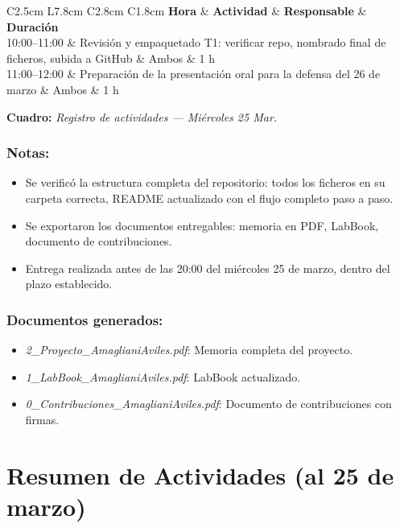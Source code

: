 \documentclass[11pt,a4paper]{article}
\newcommand{\notetitle}[1]{\subsubsection*{#1}}
\newcommand{\activitytable}[2]{%
  \begin{center}
  \begin{tabular}{C{2.5cm} L{7.8cm} C{2.8cm} C{1.8cm}}
  \toprule
  \rowcolor{white}
  \textbf{Hora} & \textbf{Actividad} & \textbf{Responsable} & \textbf{Duración} \\
  \midrule
  #1
  \bottomrule
  \end{tabular}
  \end{center}
  \vspace{-4pt}
  {\small\textbf{Cuadro:} \textit{#2}}
  \vspace{6pt}
}
\begin{document}
\activitytable{%
  10:00--11:00 & Revisión y empaquetado T1: verificar repo, nombrado final de ficheros, subida a GitHub & Ambos & 1 h \\
  \rowcolor{tablegray}
  11:00--12:00 & Preparación de la presentación oral para la defensa del 26 de marzo & Ambos & 1 h \\
}{Registro de actividades --- Miércoles 25 Mar.}

\notetitle{Notas:}
\begin{itemize}
  \item Se verificó la estructura completa del repositorio: todos los ficheros en su carpeta correcta, README actualizado con el flujo completo paso a paso.
  \item Se exportaron los documentos entregables: memoria en PDF, LabBook, documento de contribuciones.
  \item Entrega realizada antes de las 20:00 del miércoles 25 de marzo, dentro del plazo establecido.
\end{itemize}

\notetitle{Documentos generados:}
\begin{itemize}
  \item \textit{2\_Proyecto\_AmaglianiAviles.pdf}: Memoria completa del proyecto.
  \item \textit{1\_LabBook\_AmaglianiAviles.pdf}: LabBook actualizado.
  \item \textit{0\_Contribuciones\_AmaglianiAviles.pdf}: Documento de contribuciones con firmas.
\end{itemize}

\newpage

\section*{Resumen de Actividades (al 25 de marzo)}
\end{document}
